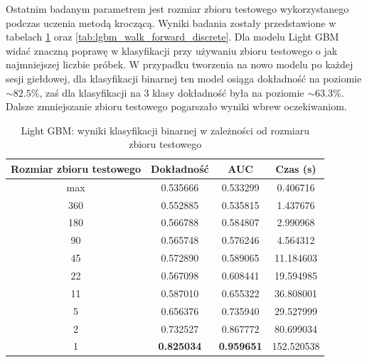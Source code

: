 \documentclass[a4paper, twoside, 11pt, openright]{article}
\begin{document}
Ostatnim badanym parametrem jest rozmiar zbioru testowego wykorzystanego podczas uczenia metodą kroczącą. Wyniki badania zostały przedstawione w tabelach \ref{tab:lgbm_walk_forward_binary} oraz \ref{tab:lgbm_walk_forward_discrete}. Dla modelu Light GBM widać znaczną poprawę w klasyfikacji przy używaniu zbioru testowego o jak najmniejszej liczbie próbek. W przypadku tworzenia na nowo modelu po każdej sesji giełdowej, dla klasyfikacji binarnej ten model osiąga dokładność na poziomie $\sim 82.5\%$, zaś dla klasyfikacji na 3 klasy dokładność była na poziomie $\sim 63.3\%$. Dalsze zmniejszanie zbioru testowego pogarszało wyniki wbrew oczekiwaniom.

\begin{table}[H]
    \centering
    \begin{tabular}{|c|c|c|c|}
    \hline
        \textbf{Rozmiar zbioru testowego} & \textbf{Dokładność} & \textbf{AUC} & \textbf{Czas (s)} \\ \hline
max   						  & 0.535666 &  0.533299 &  0.406716 \\ \hline
360                         &  0.552885 &  0.535815 &    1.437676 \\ \hline
180                        &  0.566788 &  0.584807 &    2.990968 \\ \hline
90                         &  0.565748 &  0.576246 &    4.564312 \\ \hline
45                         &  0.572890 &  0.589065 &   11.184603 \\ \hline
22                          &  0.567098 &  0.608441 &   19.594985 \\ \hline
11                          &  0.587010 &  0.655322 &   36.808001 \\ \hline
5                           &  0.656376 &  0.735940 &   29.527999 \\ \hline
2                           &  0.732527 &  0.867772 &   80.699034 \\ \hline
1                           &  \textbf{0.825034} &  \textbf{0.959651} &  152.520538 \\ \hline

    \end{tabular}
    \caption{Light GBM: wyniki klasyfikacji binarnej w zależności od rozmiaru zbioru testowego}
    \label{tab:lgbm_walk_forward_binary}
\end{table}
\end{document}
